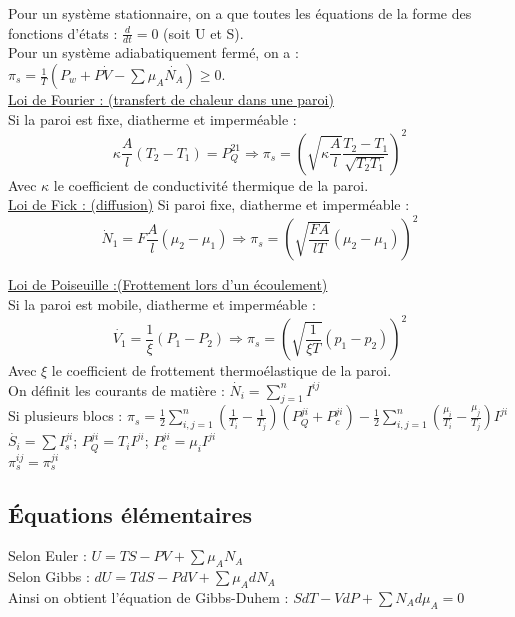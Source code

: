 \documentclass[../main.tex]{subfiles}
\begin{document}
Pour un système stationnaire, on a que toutes les équations de la forme des fonctions d'états : $\frac{d}{dt} = 0$ (soit U et S).\\

Pour un système adiabatiquement fermé, on a : $\pi_s = \frac{1}{T}(P_w + P\dot{V} - \sum \mu_A \dot{N_A}) \geq 0$.\\

\quad \underline{Loi de Fourier : (transfert de chaleur dans une paroi)}\\
Si la paroi est fixe, diatherme et imperméable :\\
\begin{equation}
    \kappa \frac{A}{l} (T_2-T_1) = P_Q^{21} \Rightarrow \pi_s = (\sqrt{\kappa \frac{A}{l}} \frac{T_2-T_1}{\sqrt{T_2T_1}})^2
\end{equation}
Avec $\kappa$ le coefficient de conductivité thermique de la paroi.\\

\quad \underline{Loi de Fick : (diffusion)}
Si paroi fixe, diatherme et imperméable :\\
\begin{equation}
    \dot{N}_1 = F \frac{A}{l}(\mu_2 - \mu_1) \Rightarrow \pi_s = (\sqrt{\frac{FA}{lT}}(\mu_2 - \mu_1))^2
\end{equation}

\quad \underline{Loi de Poiseuille :(Frottement lors d'un écoulement)}\\
Si la paroi est mobile, diatherme et imperméable :
\begin{equation}
    \dot{V_1} = \frac{1}{\xi}(P_1-P_2) \Rightarrow \pi_s = (\sqrt{\frac{1}{\xi T}}(p_1-p_2))^2
\end{equation}
Avec $\xi$ le coefficient de frottement thermoélastique de la paroi.\\

On définit les courants de matière : $\dot{N_i} = \sum_{j=1}^n I^{ij}$\\
Si plusieurs blocs : $\pi_s = \frac{1}{2} \sum_{i,j=1}^n (\frac{1}{T_i} - \frac{1}{T_j}) (P_Q^{ji} + P_c^{ji}) - \frac{1}{2} \sum_{i,j=1}^n (\frac{\mu_i}{T_i} - \frac{\mu_j}{T_j})I^{ji} $\\
$\dot{S_i} = \sum I_s^{ji}$; $P_Q^{ji} = T_i I^{ji}$; $P_c^{ji} = \mu_i I^{ji}$\\
$\pi_s^{ij} = \pi_s^{ji}$\\

\subsection{Équations élémentaires}
Selon Euler : $U = TS - PV + \sum \mu_A N_A$\\
Selon Gibbs : $dU = TdS - PdV + \sum \mu_A dN_A$\\
Ainsi on obtient l'équation de Gibbs-Duhem : $SdT - VdP + \sum N_A d\mu_A = 0$\\
\end{document}
